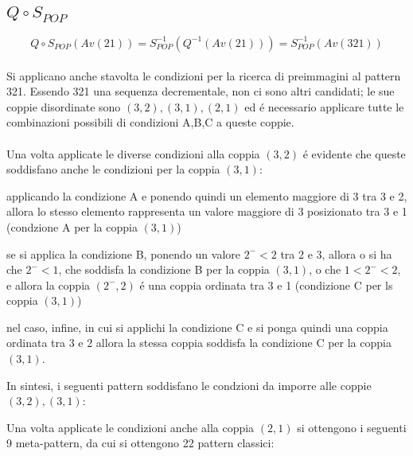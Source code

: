 \subsection*{$Q\circ{S_{POP}}$}
$$Q\circ{S_{POP}}(Av(21)) = S_{POP}^{-1}(Q^{-1}(Av(21))) = S_{POP}^{-1}(Av(321))$$
\\Si applicano anche stavolta le condizioni per la ricerca di preimmagini al pattern 321. Essendo 321 una sequenza decrementale, non ci sono altri candidati; le sue coppie disordinate sono $(3,2),(3,1),(2,1)$ ed \'e necessario applicare tutte le combinazioni possibili di condizioni A,B,C a queste coppie.\\\\
Una volta applicate le diverse condizioni alla coppia $(3,2)$ \'e evidente che queste soddisfano anche le condizioni per la coppia $(3,1)$:
\begin{description}
	\item applicando la condizione A e ponendo quindi un elemento maggiore di 3 tra 3 e 2, allora lo stesso elemento rappresenta un valore maggiore di 3 posizionato tra 3 e 1 (condzione A per la coppia $(3,1)$)
	\item se si applica la condizione B, ponendo un valore $2^-<2$ tra 2 e 3, allora o si ha che $2^-<1$, che soddisfa la condizione B per la coppia $(3,1)$, o che $1<2^-<2$, e allora la coppia $(2^-,2)$ \'e una coppia ordinata tra 3 e 1 (condizione C per ls coppia $(3,1)$)
	\item nel caso, infine, in cui si applichi la condizione C e si ponga quindi una coppia ordinata tra 3 e 2 allora la stessa coppia soddisfa la condizione C per la coppia $(3,1)$.
\end{description}
In sintesi, i seguenti pattern soddisfano le condzioni da imporre alle coppie $(3,2),(3,1)$:
\begin{center}
\end{center}
Una volta applicate le condizioni anche alla coppia $(2,1)$ si ottengono i seguenti 9 meta-pattern, da cui si ottengono 22 pattern classici:
\begin{center}
\end{center}
